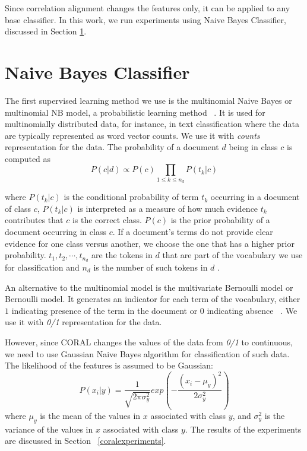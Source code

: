 Since correlation alignment changes the features only, it can be applied to any base classifier. In this work, we run experiments using Naive Bayes Classifier, discussed in Section \ref{nbc}. 

\section{Naive Bayes Classifier}
\label{nbc}

The first supervised learning method we use is the multinomial Naive Bayes or multinomial NB model, a probabilistic learning method ~\citep{ir}. It is used for multinomially distributed data, for instance, in text classification where the data are typically represented as word vector counts. We use it with \textit{counts} representation for the data.
The probability of a document $d$ being in class $c$ is computed as \[ P(c|d) \propto P(c)\prod_{1 \leqslant k \leqslant n_{d}} P(t_k|c) \] 

where $P(t_k|c)$ is the conditional probability of term $t_k$ occurring in a document of class $c$, $P(t_k|c)$ is interpreted as a measure of how much evidence $t_k$ contributes that $c$ is the correct class. $P(c)$ is the prior probability of a document occurring in class $c$. If a document’s terms do not provide clear evidence for one class versus another, we choose the one that has a higher prior probability. $t_1, t_2, \cdots , t_{n_d}$ are the tokens in $d$ that are part of the vocabulary we use for classification and $n_d$ is the number of such tokens in $d$ \citep{ir}.

An alternative to the multinomial model is the multivariate Bernoulli model or Bernoulli model. It generates an indicator for each term of the vocabulary, either $1$ indicating presence of the term in the document or $0$ indicating absence ~\citep{ir}. We use it with \textit{0/1} representation for the data. 

However, since CORAL changes the values of the data from \textit{0/1} to continuous, we need to use Gaussian Naive Bayes algorithm for classification of such data. The likelihood of the features is assumed to be Gaussian: \[ P(x_i|y) = \frac{1}{\sqrt{2\pi \sigma ^{2}_y}} exp\left ( - \frac{(x_i - \mu_y)^2}{2\sigma ^2_y} \right ) \] where  $\mu_y$ is the mean of the values in $x$ associated with class $y$, and $\sigma ^{2}_y$ is the variance of the values in $x$ associated with class $y$. 
The results of the experiments are discussed in Section ~\ref{coralexperiments}.


